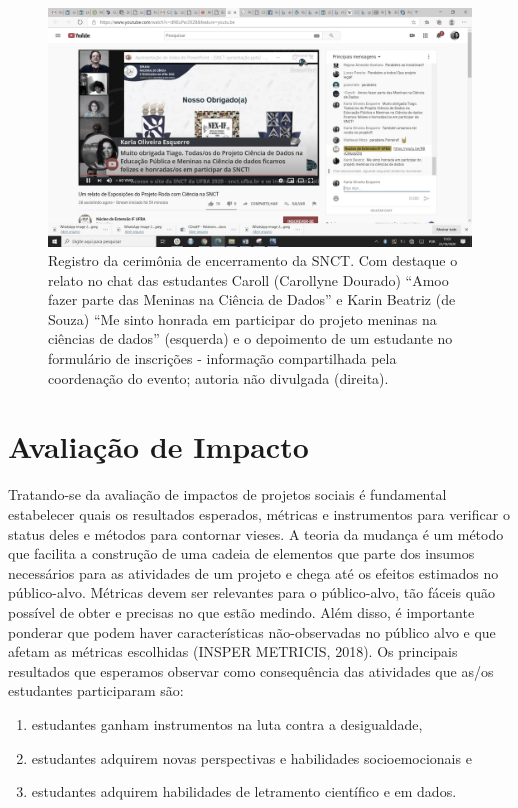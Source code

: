 \documentclass[
]{book}
\providecommand{\tightlist}{%
  \setlength{\itemsep}{0pt}\setlength{\parskip}{0pt}}
\begin{document}
\begin{figure}
\includegraphics[width=26.67in]{images/image101} \caption{Registro da cerimônia de encerramento da SNCT. Com destaque o relato no chat das estudantes Caroll (Carollyne Dourado) “Amoo fazer parte das Meninas na Ciência de Dados” e Karin Beatriz (de Souza) “Me sinto honrada em participar do projeto meninas na ciências de dados” (esquerda) e o depoimento de um estudante no formulário de inscrições - informação compartilhada pela coordenação do evento; autoria não divulgada (direita).}\label{fig:encerrSNCT}
\end{figure}

\hypertarget{avaliauxe7uxe3o-de-impacto}{%
\chapter{Avaliação de Impacto}\label{avaliauxe7uxe3o-de-impacto}}

Tratando-se da avaliação de impactos de projetos sociais é fundamental estabelecer quais os resultados esperados, métricas e instrumentos para verificar o status deles e métodos para contornar vieses. A teoria da mudança é um método que facilita a construção de uma cadeia de elementos que parte dos insumos necessários para as atividades de um projeto e chega até os efeitos estimados no público-alvo. Métricas devem ser relevantes para o público-alvo, tão fáceis quão possível de obter e precisas no que estão medindo. Além disso, é importante ponderar que podem haver características não-observadas no público alvo e que afetam as métricas escolhidas (INSPER METRICIS, 2018).
Os principais resultados que esperamos observar como consequência das atividades que as/os estudantes participaram são:

\begin{enumerate}
\def\labelenumi{(\alph{enumi})}
\tightlist
\item
  estudantes ganham instrumentos na luta contra a desigualdade,
\item
  estudantes adquirem novas perspectivas e habilidades socioemocionais e
\item
  estudantes adquirem habilidades de letramento científico e em dados.
\end{enumerate}
\end{document}
